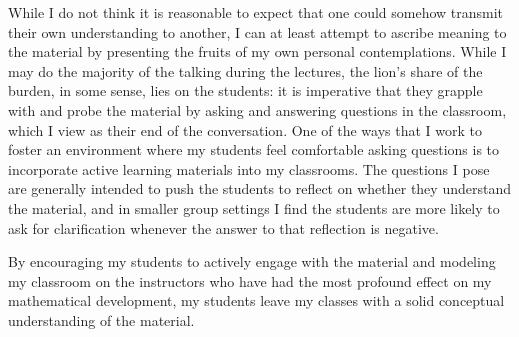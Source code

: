 While I do not think it is reasonable to expect that one could somehow transmit their own understanding to another, I can at least attempt to ascribe meaning to the material by presenting the fruits of my own personal contemplations.
While I may do the majority of the talking during the lectures, the lion's share of the burden, in some sense, lies on the students: it is imperative that they grapple with and probe the material by asking and answering questions in the classroom, which I view as their end of the conversation.
One of the ways that I work to foster an environment where my students feel comfortable asking questions is to incorporate active learning materials into my classrooms.
The questions I pose are generally intended to push the students to reflect on whether they understand the material, and in smaller group settings I find the students are more likely to ask for clarification whenever the answer to that reflection is negative.


By encouraging my students to actively engage with the material and modeling my classroom on the instructors who have had the most profound effect on my mathematical development, my students leave my classes with a solid conceptual understanding of the material.
